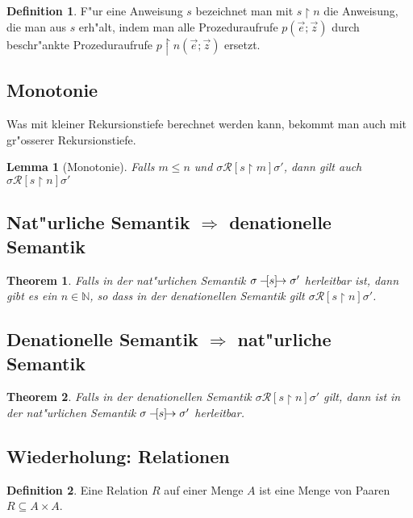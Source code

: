 \documentclass[german,10pt, a4paper, twocolumn]{scrartcl}
\newcommand{\natsemarr}[1]{\ensuremath{-\hspace*{-1.52mm}[#1]\hspace*{-1.61mm}\rightarrow}}
\newtheorem{lemma}{Lemma}[section]
\newtheorem{theorem}{Theorem}[section]
\theoremstyle{definition}
\newtheorem{definition}{Definition}[section]
\theoremstyle{remark}
\begin{document}
\begin{definition}
	F"ur eine Anweisung $s$ bezeichnet man mit $s\upharpoonright n$ die Anweisung, die man aus $s$ erh"alt, indem man alle Prozeduraufrufe $p(\vec{e};\vec{z})$ durch beschr"ankte Prozeduraufrufe $p\upharpoonright n (\vec{e};\vec{z})$ ersetzt.
\end{definition}

\subsection{Monotonie}

Was mit kleiner Rekursionstiefe berechnet werden kann, bekommt man auch mit gr"osserer Rekursionstiefe.

\begin{lemma}[Monotonie]
	Falls $m\leq n$ und $\sigma \mathcal{R}[s\upharpoonright m]\sigma'$, dann gilt auch $\sigma \mathcal{R}[s\upharpoonright n]\sigma'$
\end{lemma}

\subsection{Nat"urliche Semantik $\Rightarrow$ denationelle Semantik}

\begin{theorem}
	Falls in der nat"urlichen Semantik $\sigma \natsemarr{s} \sigma'$ herleitbar ist, dann gibt es ein $n\in \mathbb{N}$, so dass in der denationellen Semantik gilt $\sigma \mathcal{R}[s\upharpoonright n]\sigma'$.
\end{theorem}

\subsection{Denationelle Semantik $\Rightarrow$ nat"urliche Semantik}

\begin{theorem}
	Falls in der denationellen Semantik $\sigma \mathcal{R}[s\upharpoonright n] \sigma'$ gilt, dann ist in der nat"urlichen Semantik $\sigma \natsemarr{s} \sigma'$ herleitbar.
\end{theorem}

\subsection{Wiederholung: Relationen}

\begin{definition}
	Eine Relation $R$ auf einer Menge $A$ ist eine Menge von Paaren $R\subseteq A\times A$.
\end{definition}
\end{document}
